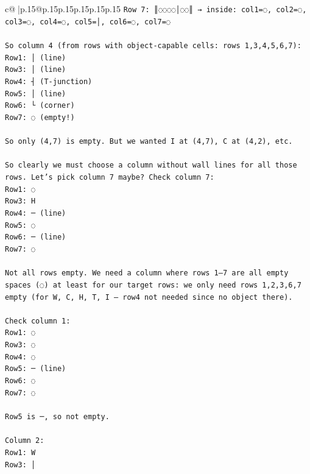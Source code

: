 \documentclass{article}
\begin{document}
{\begin{supertabular}{c@{$\;$}|p{.15\linewidth}@{}p{.15\linewidth}p{.15\linewidth}p{.15\linewidth}p{.15\linewidth}p{.15\linewidth}}
{{{\texttt{Row 7: ║◌◌◌◌│◌◌║ → inside: col1=◌, col2=◌, col3=◌, col4=◌, col5=│, col6=◌, col7=◌} \\
\\ 
\texttt{So column 4 (from rows with object{-}capable cells: rows 1,3,4,5,6,7):  } \\
\texttt{Row1: │ (line)  } \\
\texttt{Row3: │ (line)  } \\
\texttt{Row4: ┤ (T{-}junction)  } \\
\texttt{Row5: │ (line)  } \\
\texttt{Row6: └ (corner)  } \\
\texttt{Row7: ◌ (empty!)} \\
\\ 
\texttt{So only (4,7) is empty. But we wanted I at (4,7), C at (4,2), etc.} \\
\\ 
\texttt{So clearly we must choose a column without wall lines for all those rows. Let's pick column 7 maybe? Check column 7:  } \\
\texttt{Row1: ◌  } \\
\texttt{Row3: H  } \\
\texttt{Row4: ─ (line)  } \\
\texttt{Row5: ◌  } \\
\texttt{Row6: ─ (line)  } \\
\texttt{Row7: ◌  } \\
\\ 
\texttt{Not all rows empty. We need a column where rows 1–7 are all empty spaces (◌) at least for our target rows: we only need rows 1,2,3,6,7 empty (for W, C, H, T, I — row4 not needed since no object there).  } \\
\\ 
\texttt{Check column 1:  } \\
\texttt{Row1: ◌  } \\
\texttt{Row3: ◌  } \\
\texttt{Row4: ◌  } \\
\texttt{Row5: ─ (line)  } \\
\texttt{Row6: ◌  } \\
\texttt{Row7: ◌  } \\
\\ 
\texttt{Row5 is ─, so not empty.} \\
\\ 
\texttt{Column 2:  } \\
\texttt{Row1: W  } \\
\texttt{Row3: │  } \\
}}}
\end{supertabular}}
\end{document}
